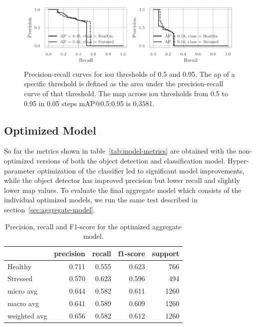 \documentclass[draft,final]{vutinfth} %
\begin{document}
\begin{figure}
  \centering
  \includegraphics{graphics/APmodel-model-optimized-relabeled.pdf}
  \caption[Aggregate model AP@0.5 and AP@0.95.]{Precision-recall
    curves for \gls{iou} thresholds of 0.5 and 0.95. The \gls{ap} of a
    specific threshold is defined as the area under the
    precision-recall curve of that threshold. The \gls{map} across
    \gls{iou} thresholds from 0.5 to 0.95 in 0.05 steps
    \textsf{mAP}@0.5:0.95 is 0.3581.}
  \label{fig:aggregate-ap}
\end{figure}

\subsection{Optimized Model}
\label{ssec:model-optimized}

So far the metrics shown in table~\ref{tab:model-metrics} are obtained
with the non-optimized versions of both the object detection and
classification model. Hyper-parameter optimization of the classifier
led to significant model improvements, while the object detector has
improved precision but lower recall and slightly lower \gls{map}
values. To evaluate the final aggregate model which consists of the
individual optimized models, we run the same test described in
section~\ref{sec:aggregate-model}.

\begin{table}
  \centering
  \begin{tabular}{lrrrr}
    \toprule
    {} &  precision &  recall &  f1-score &  support \\
    \midrule
    Healthy      &      0.711 &   0.555 &     0.623 &    766 \\
    Stressed     &      0.570 &   0.623 &     0.596 &    494 \\
    micro avg    &      0.644 &   0.582 &     0.611 &   1260 \\
    macro avg    &      0.641 &   0.589 &     0.609 &   1260 \\
    weighted avg &      0.656 &   0.582 &     0.612 &   1260 \\
    \bottomrule
  \end{tabular}
  \caption{Precision, recall and F1-score for the optimized aggregate
    model.}
  \label{tab:model-metrics-hyp}
\end{table}
\end{document}
